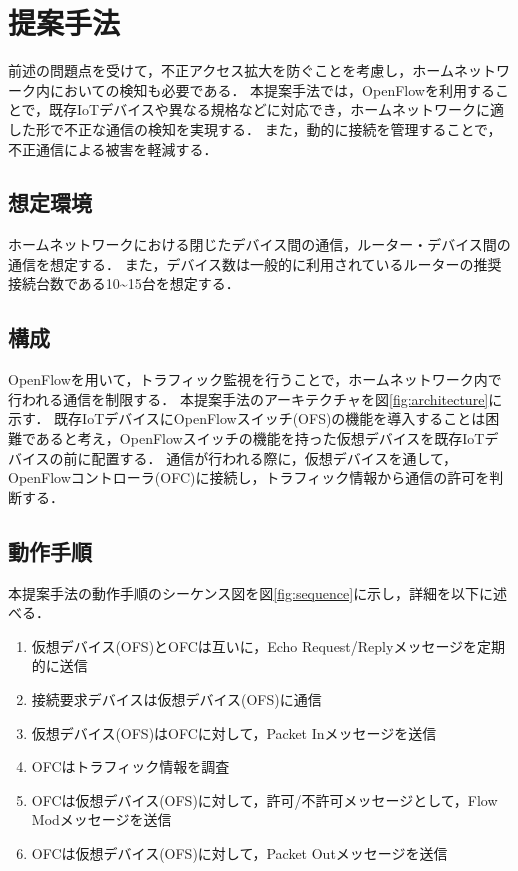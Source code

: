 \documentclass[a4paper,10pt,twocolumn,uplatex]{jsarticle}
\begin{document}
\section{提案手法}
前述の問題点を受けて，不正アクセス拡大を防ぐことを考慮し，ホームネットワーク内においての検知も必要である．
本提案手法では，OpenFlowを利用することで，既存IoTデバイスや異なる規格などに対応でき，ホームネットワークに適した形で不正な通信の検知を実現する．
また，動的に接続を管理することで，不正通信による被害を軽減する．

\subsection{想定環境}
ホームネットワークにおける閉じたデバイス間の通信，ルーター・デバイス間の通信を想定する．
また，デバイス数は一般的に利用されているルーターの推奨接続台数である10\textasciitilde15台を想定する．

\subsection{構成}
OpenFlowを用いて，トラフィック監視を行うことで，ホームネットワーク内で行われる通信を制限する．
本提案手法のアーキテクチャを図\ref{fig:architecture}に示す．
既存IoTデバイスにOpenFlowスイッチ(OFS)の機能を導入することは困難であると考え，OpenFlowスイッチの機能を持った仮想デバイスを既存IoTデバイスの前に配置する．
通信が行われる際に，仮想デバイスを通して，OpenFlowコントローラ(OFC)に接続し，トラフィック情報から通信の許可を判断する．

\subsection{動作手順}
本提案手法の動作手順のシーケンス図を図\ref{fig:sequence}に示し，詳細を以下に述べる．

\begin{enumerate}
  \item 仮想デバイス(OFS)とOFCは互いに，Echo Request/Replyメッセージを定期的に送信
  \item 接続要求デバイスは仮想デバイス(OFS)に通信
  \item 仮想デバイス(OFS)はOFCに対して，Packet Inメッセージを送信
  \item OFCはトラフィック情報を調査
  \item OFCは仮想デバイス(OFS)に対して，許可/不許可メッセージとして，Flow Modメッセージを送信
  \item OFCは仮想デバイス(OFS)に対して，Packet Outメッセージを送信
\end{enumerate}
\end{document}
